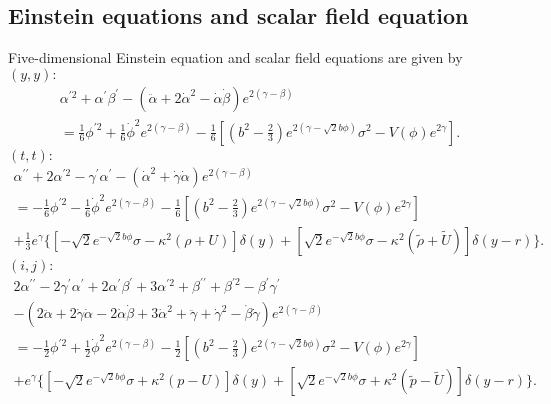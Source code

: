 \documentclass[a4paper,11pt]{article}
\begin{document}
\subsection{Einstein equations and scalar field equation}
Five-dimensional Einstein equation and scalar field equations
are given by\\
\noindent
$(y, y) : $
\begin{multline}
\alpha^{\prime 2}+\alpha^{\prime}\beta^{\prime}
          -(\ddot{\alpha}+2\dot{\alpha}^2
          -\dot{\alpha}\dot{\beta})e^{2(\gamma-\beta)} \\
=\frac{1}{6}\phi^{\prime 2}
            +\frac{1}{6}\dot{\phi}^2 e^{2(\gamma-\beta)}
-\frac{1}{6}
\left[
\left(b^2-\frac{2}{3}\right)
                 e^{2(\gamma-\sqrt{2}b\phi)}\sigma^2
-V(\phi) e^{2\gamma}
\right].
\label{eq:(yy)-component}
\end{multline}
$(t, t) : $
\begin{multline}
\alpha^{\prime\prime}+2\alpha^{\prime 2}
                   -\gamma^{\prime}\alpha^{\prime}
          -(\dot{\alpha}^2+\dot{\gamma}\dot{\alpha})e^{2(\gamma-\beta)} \\
=-\frac{1}{6}\phi^{\prime 2}
            -\frac{1}{6}\dot{\phi}^2 e^{2(\gamma-\beta)}
-\frac{1}{6}
\left[
\left(b^2-\frac{2}{3}\right)
                 e^{2(\gamma-\sqrt{2}b\phi)}\sigma^2
-V(\phi) e^{2\gamma}
\right] \\
+\frac{1}{3}e^{\gamma}\big\{ [-\sqrt{2}e^{-\sqrt{2}b\phi}\sigma
                      -\kappa^2 (\rho+U)] \delta(y)
+[\sqrt{2}e^{-\sqrt{2}b\phi}\sigma
     -\kappa^2 (\tilde{\rho}+\tilde{U}) ]\delta(y-r) \big\}.
\end{multline}
$(i, j) : $
\begin{multline}
2\alpha^{\prime\prime}-2\gamma^{\prime}\alpha^{\prime}
           +2\alpha^{\prime}\beta^{\prime}+3\alpha^{\prime 2}
           +\beta^{\prime\prime}+\beta^{\prime 2}
            -\beta^{\prime}\gamma^{\prime} \\
-(2\ddot{\alpha}+2\dot{\gamma}\dot{\alpha}
                  -2\dot{\alpha}\dot{\beta}+3\dot{\alpha}^2
                  +\ddot{\gamma}+\dot{\gamma}^2
   -\dot{\beta}\dot{\gamma}) e^{2(\gamma-\beta)} \hspace{5cm} \\
=-\frac{1}{2}\phi^{\prime 2}
            +\frac{1}{2}\dot{\phi}^2 e^{2(\gamma-\beta)}
            -\frac{1}{2}
\left[
\left(b^2-\frac{2}{3}\right)
                 e^{2(\gamma-\sqrt{2}b\phi)}\sigma^2
-V(\phi) e^{2\gamma}
\right] \\
+ e^{\gamma}\big\{ [-\sqrt{2}e^{-\sqrt{2}b\phi}\sigma
                      +\kappa^2 (p-U) ]\delta(y) 
+[ \sqrt{2}e^{-\sqrt{2}b\phi}\sigma
    +\kappa^2 (\tilde{p}-\tilde{U}) ] \delta(y-r) \big\}.
\end{multline}
\end{document}
